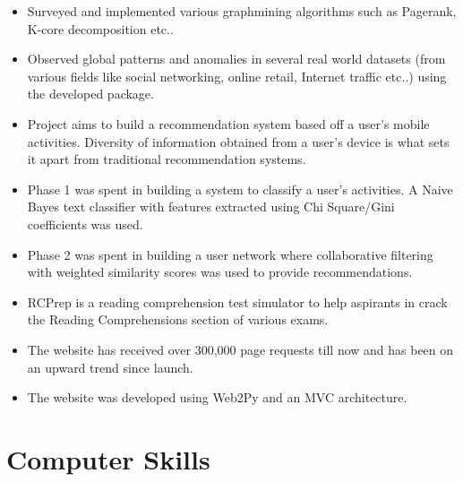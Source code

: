 \documentclass[10pt,a4paper,sans]{moderncv}
\begin{document}
{
\begin{itemize}
\item Surveyed and implemented various graphmining algorithms such as Pagerank,
K-core decomposition etc..
\item Observed global patterns and anomalies in several real world datasets
(from various fields like social networking, online retail, Internet traffic
etc..) using the developed package.
\end{itemize}}

{
\begin{itemize}
\item Project aims to build a recommendation system based off a user's mobile
activities. Diversity of information obtained from a user's device is what sets
it apart from traditional recommendation systems.
\item Phase 1 was spent in building a system to classify a user's activities. A
 Naive Bayes text classifier with features extracted using Chi Square/Gini
 coefficients was used.
\item Phase 2 was spent in building a user network where collaborative filtering
 with weighted similarity scores was used to provide recommendations.
\end{itemize}}

{
\begin{itemize}
\item RCPrep is a reading comprehension test simulator to help aspirants in
crack the Reading Comprehensions section of various exams.
\item The website has received over 300,000 page requests till now and has been
on an upward trend since launch.
\item The website was developed using Web2Py and an MVC architecture.
\end{itemize}}


\section{Computer Skills}

\end{document}

